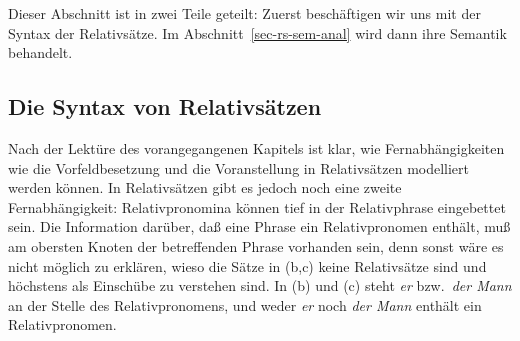 Dieser Abschnitt ist in zwei Teile geteilt: Zuerst beschäftigen wir uns
mit der Syntax der Relativsätze. Im Abschnitt~\ref{sec-rs-sem-anal} wird dann ihre Semantik
behandelt.

\subsection{Die Syntax von Relativsätzen}
\label{sec-syntax-rs}
\label{lp-rs}%

Nach der Lektüre des vorangegangenen Kapitels ist klar, wie Fernabhängigkeiten wie \zb die
Vorfeldbesetzung und die Voranstellung in Relativsätzen modelliert werden können. In Relativsätzen gibt
es jedoch noch eine zweite Fernabhängigkeit: Relativpronomina können tief in der Relativphrase
eingebettet sein. Die Information darüber, daß eine Phrase ein Relativpronomen enthält, muß
am obersten Knoten der betreffenden Phrase vorhanden sein, denn sonst wäre es nicht möglich zu erklären,
wieso die Sätze in (b,c) keine Relativsätze sind und höchstens als Einschübe zu verstehen sind.
\eal
{}
\zl
In (b) und (c) steht \emph{er} bzw.\ \emph{der Mann} an der Stelle des
Relativpronomens, und weder \emph{er} noch \emph{der Mann} enthält ein Relativpronomen.

